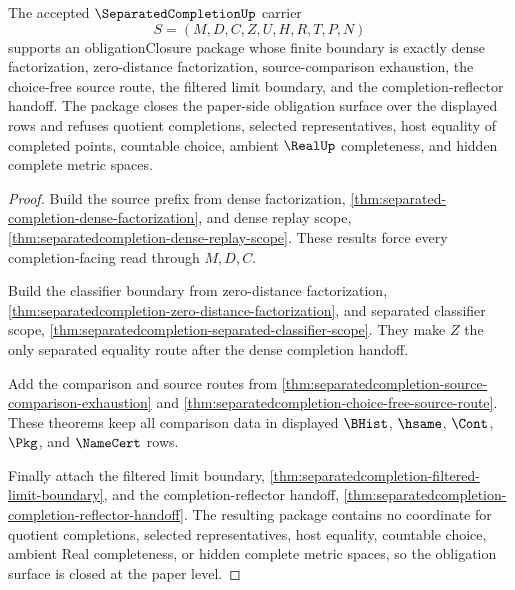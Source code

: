 \begin{theorem}
\label{thm:separatedcompletion-obligation-closure-package}
The accepted $\SeparatedCompletionUp$ carrier
$$
S=(M,D,C,Z,U,H,R,T,P,N)
$$
supports an obligationClosure package whose finite boundary is exactly dense factorization, zero-distance factorization, source-comparison exhaustion, the choice-free source route, the filtered limit boundary, and the completion-reflector handoff. The package closes the paper-side obligation surface over the displayed rows and refuses quotient completions, selected representatives, host equality of completed points, countable choice, ambient $\RealUp$ completeness, and hidden complete metric spaces.
\end{theorem}
\begin{proof}
Build the source prefix from dense factorization, \autoref{thm:separated-completion-dense-factorization}, and dense replay scope, \autoref{thm:separatedcompletion-dense-replay-scope}. These results force every completion-facing read through $M,D,C$.

Build the classifier boundary from zero-distance factorization, \autoref{thm:separatedcompletion-zero-distance-factorization}, and separated classifier scope, \autoref{thm:separatedcompletion-separated-classifier-scope}. They make $Z$ the only separated equality route after the dense completion handoff.

Add the comparison and source routes from \autoref{thm:separatedcompletion-source-comparison-exhaustion} and \autoref{thm:separatedcompletion-choice-free-source-route}. These theorems keep all comparison data in displayed $\BHist$, $\hsame$, $\Cont$, $\Pkg$, and $\NameCert$ rows.

Finally attach the filtered limit boundary, \autoref{thm:separatedcompletion-filtered-limit-boundary}, and the completion-reflector handoff, \autoref{thm:separatedcompletion-completion-reflector-handoff}. The resulting package contains no coordinate for quotient completions, selected representatives, host equality, countable choice, ambient Real completeness, or hidden complete metric spaces, so the obligation surface is closed at the paper level.
\end{proof}

